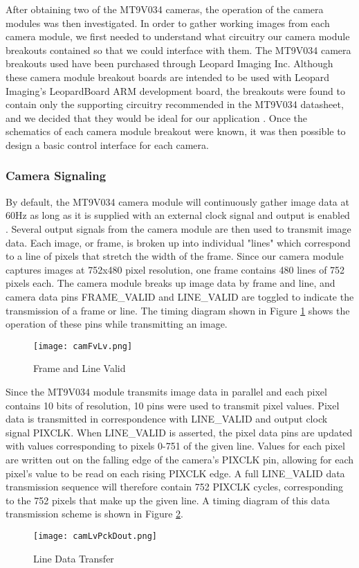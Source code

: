 \par
After obtaining two of the MT9V034 cameras, the operation of the camera modules was then investigated. In order to gather working images from each camera module, we first needed to understand what circuitry our camera module breakouts contained so that we could interface with them. The MT9V034 camera breakouts used have been purchased through Leopard Imaging Inc. Although these camera module breakout boards are intended to be used with Leopard Imaging's LeopardBoard ARM development board, the breakouts were found to contain only the supporting circuitry recommended in the MT9V034 datasheet, and we decided that they would be ideal for our application \cite{livm34lp,mt9v034}. Once the schematics of each camera module breakout were known, it was then possible to design a basic control interface for each camera.
\subsubsection{Camera Signaling}
By default, the MT9V034 camera module will continuously gather image data at 60Hz  as long as it is supplied with an external clock signal and output is enabled \cite{mt9v034}. Several output signals from the camera module are then used to transmit image data. Each image, or frame, is broken up into individual "lines" which correspond to a line of pixels that stretch the width of the frame. Since our camera module captures images at 752x480 pixel resolution, one frame contains 480 lines of 752 pixels each. The camera module breaks up image data by frame and line, and camera data pins FRAME\_VALID and LINE\_VALID are toggled to indicate the transmission of a frame or line. The timing diagram shown in Figure \ref{FvLv} shows the operation of these pins while transmitting an image.

\begin{figure}[H]
	\centerline{\texttt{[image: camFvLv.png]}}
	\caption{Frame and Line Valid \cite{mt9v034}}
	\label{FvLv}
\end{figure}

\par
Since the MT9V034 module transmits image data in parallel and each pixel contains 10 bits of resolution, 10 pins were used to transmit pixel values. Pixel data is transmitted in correspondence with LINE\_VALID and output clock signal PIXCLK. When LINE\_VALID is asserted, the pixel data pins are updated with values corresponding to pixels 0-751 of the given line. Values for each pixel are written out on the falling edge of the camera's PIXCLK pin, allowing for each pixel's value to be read on each rising PIXCLK edge. A full LINE\_VALID data transmission sequence will therefore contain 752 PIXCLK cycles, corresponding to the 752 pixels that make up the given line. A timing diagram of this data transmission scheme is shown in Figure \ref{LvDout}.  
\begin{figure}[H]
	\centerline{\texttt{[image: camLvPckDout.png]}}
	\caption{Line Data Transfer \cite{mt9v034}}
	\label{LvDout}
\end{figure}

